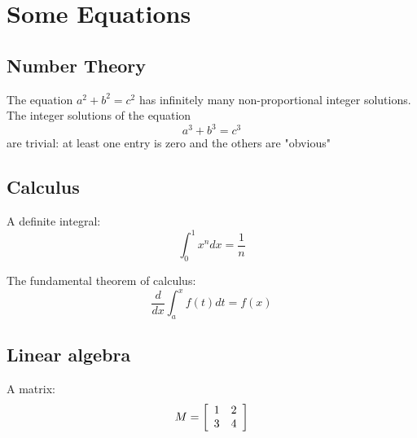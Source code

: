 \section*{\hypertarget{_some_equations}{Some Equations}}

\subsection*{\hypertarget{_number_theory}{Number Theory}}

The equation
$a^2 + b^2 = c^2$ has infinitely many
non-proportional integer solutions.
The integer solutions of the equation
\[
  a^3 + b^3 = c^3
\]
are trivial: at least one entry is
zero and the others are "obvious"




\subsection*{\hypertarget{_calculus}{Calculus}}

A definite integral:
\[
  \int_0^1 x^n dx = \frac{1}{n}
\]


The fundamental theorem of calculus:
\[
   \frac{d}{dx} \int_a^x f(t) dt = f(x)
\]




\subsection*{\hypertarget{_linear_algebra}{Linear algebra}}

A matrix:
\[
M = \left[
  \begin{array}{ c c }
	 1 & 2 \\
	 3 & 4
  \end{array} \right]
\]






